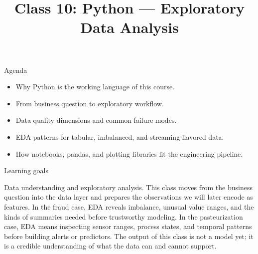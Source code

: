 

\title{Class 10: Python --- Exploratory Data Analysis}
\author{\coursename}
\date{}



\frame{\titlepage \coursefooter}

\begin{frame}{Agenda}
\begin{itemize}
\item Why Python is the working language of this course.
\item From business question to exploratory workflow.
\item Data quality dimensions and common failure modes.
\item EDA patterns for tabular, imbalanced, and streaming-flavored data.
\item How notebooks, pandas, and plotting libraries fit the engineering pipeline.
\end{itemize}
\coursefooter
\end{frame}

\begin{frame}{Learning goals}
\coursefooter
\end{frame}

\coursecontextframe
{Data understanding and exploratory analysis.}
{This class moves from the business question into the data layer and prepares the observations we will later encode as features.}
{In the fraud case, EDA reveals imbalance, unusual value ranges, and the kinds of summaries needed before trustworthy modeling.}
{In the pasteurization case, EDA means inspecting sensor ranges, process states, and temporal patterns before building alerts or predictors.}
{The output of this class is not a model yet; it is a credible understanding of what the data can and cannot support.}

